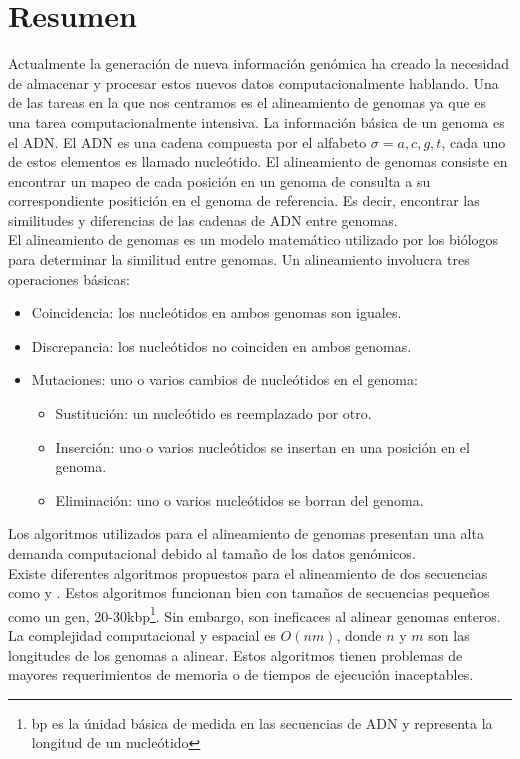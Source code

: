 \documentclass[12pt,a4paper]{article}
\begin{document}
\section{Resumen}
\indent
Actualmente la generación de nueva información genómica ha creado la necesidad de almacenar y procesar estos nuevos datos computacionalmente hablando. Una de las tareas en la que nos centramos es el alineamiento de genomas ya que es una tarea computacionalmente intensiva. La información básica de un genoma es el ADN. El ADN es una cadena compuesta por el alfabeto $\sigma={a,c,g,t}$, cada uno de estos elementos es llamado nucleótido. El alineamiento de genomas consiste en encontrar un mapeo de cada posición en un genoma de consulta a su correspondiente positición en el genoma de referencia. Es decir, encontrar las similitudes y diferencias de las cadenas de ADN entre genomas.\\
El alineamiento de genomas es un modelo matemático utilizado por los biólogos para determinar la similitud entre genomas. Un alineamiento involucra tres operaciones básicas:
\begin{itemize}
  \item Coincidencia: los nucleótidos en ambos genomas son iguales.
  \item Discrepancia: los nucleótidos no coinciden en ambos genomas.
  \item Mutaciones: uno o varios cambios de nucleótidos en el genoma:
    \begin{itemize}
      \item Sustitución: un nucleótido es reemplazado por otro.
      \item Inserción: uno o varios nucleótidos se insertan en una posición en el genoma.
      \item Eliminación: uno o varios nucleótidos se borran del genoma.
    \end{itemize}
\end{itemize}
Los algoritmos utilizados para el alineamiento de genomas presentan una alta demanda computacional debido al tamaño de los datos genómicos.\\
\indent
Existe diferentes algoritmos propuestos para el alineamiento de dos secuencias como \cite{Needleman1970General} y \cite{Waterman}. Estos algoritmos funcionan bien con tamaños de secuencias pequeños como un gen, 20-30kbp\footnote{bp es la únidad básica de medida en las secuencias de ADN y representa la longitud de un nucleótido}. Sin embargo, son ineficaces al alinear genomas enteros. La complejidad computacional y espacial es $O(nm)$, donde $n$ y $m$ son las longitudes de los genomas a alinear. Estos algoritmos tienen problemas de mayores requerimientos de memoria o de tiempos de ejecución inaceptables.\\
\end{document}

